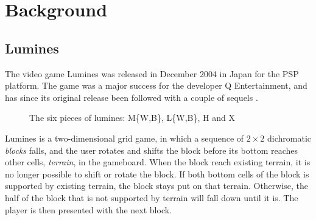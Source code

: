 \section{Background}
\label{sec:background}

\subsection{Lumines}
The video game Lumines was released in December 2004 in Japan for the PSP platform. The game was a major success for the developer Q Entertainment, and has since its original release been followed with a couple of sequels \cite{wiki:lumines}.
\begin{figure}[H]
    \centering
    \caption{The six pieces of lumines: M\{W,B\}, L\{W,B\}, H and X}
    \label{fig:pieces}
\end{figure}

Lumines is a two-dimensional grid game, in which a sequence of $2 \times 2$ dichromatic \textit{blocks} falls, and the user rotates and shifts the block before its bottom  reaches other cells, \textit{terrain}, in the gameboard. When the block reach existing terrain, it is no longer possible to shift or rotate the block. If both bottom cells of the block is supported by existing terrain, the block stays put on that terrain. Otherwise, the half of the block that is not supported by terrain will fall down until it is. The player is then presented with the next block.

